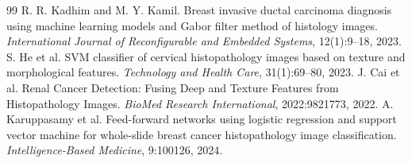 \documentclass[10pt,twocolumn]{article}
\begin{document}
\begin{thebibliography}{99}
 R. R. Kadhim and M. Y. Kamil. Breast invasive ductal carcinoma diagnosis using machine learning models and Gabor filter method of histology images. \emph{International Journal of Reconfigurable and Embedded Systems}, 12(1):9--18, 2023.
 S. He et al. SVM classifier of cervical histopathology images based on texture and morphological features. \emph{Technology and Health Care}, 31(1):69--80, 2023.
 J. Cai et al. Renal Cancer Detection: Fusing Deep and Texture Features from Histopathology Images. \emph{BioMed Research International}, 2022:9821773, 2022.
 A. Karuppasamy et al. Feed-forward networks using logistic regression and support vector machine for whole-slide breast cancer histopathology image classification. \emph{Intelligence-Based Medicine}, 9:100126, 2024.
\end{thebibliography}
\end{document}
